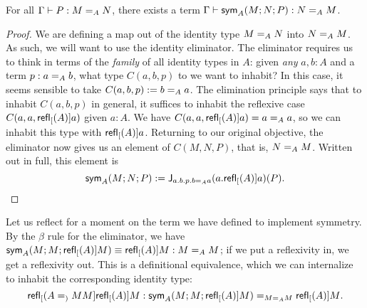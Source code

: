 \documentclass{article}
\newcommand{\Idsym}[4]{\mathsf{sym}_{#1}(#2;#3;#4)}
\begin{document}
\begin{lemma}
  For all $\hasEF{\Gamma}{P}{\Ideq{A}{M}{N}}$, there exists a term
  $\hasEF{\Gamma}{\Idsym{A}{M}{N}{P}}{\Ideq{A}{N}{M}}$.
\end{lemma}
\begin{proof}
  We are defining a map out of the identity type $\Ideq{A}{M}{N}$ into
  $\Ideq{A}{N}{M}$. As such, we will want to use the identity eliminator. The
  eliminator requires us to think in terms of the \emph{family} of all identity
  types in $A$: given \emph{any} $a,b : A$ and a term $p : \Ideq{A}{a}{b}$, what
  type $C(a,b,p)$ to we want to inhabit? In this case, it seems sensible to take
  $C(a,b,p) \eqdef \Ideq{A}{b}{a}$. The elimination principle says that to inhabit
  $C(a,b,p)$ in general, it suffices to inhabit the reflexive case
  $C(a,a,\refl[A]{a})$ given $a : A$. We have
  $C(a,a,\refl[A]{a}) = \Ideq{A}{a}{a}$, so we can inhabit this type with
  $\refl[A]{a}$. Returning to our original objective, the eliminator now gives
  us an element of $C(M,N,P)$, that is, $\Ideq{A}{N}{M}$.  Written out in full,
  this element is
  \[
    \Idsym{A}{M}{N}{P} \eqdef
    \Idelim{a.b.p.\Ideq{A}{b}{a}}{a.\refl[A]{a}}{P}. \qedhere
  \]
\end{proof}

Let us reflect for a moment on the term we have defined to implement
symmetry. By the $\beta$ rule for the eliminator, we have
$\hasEEF{\Idsym{A}{M}{M}{\refl[A]{M}}}{\refl[A]{M}}{\Ideq{A}{M}{M}}$; if we put
a reflexivity in, we get a reflexivity out. This is a definitional equivalence,
which we can internalize to inhabit the corresponding identity type:
\[
 \hasEF{\refl[\Ideq{A}{M}{M}]{\refl[A]{M}}}{\Ideq{\Ideq{A}{M}{M}}{\Idsym{A}{M}{M}{\refl[A]{M}}}{\refl[A]{M}}}.
\]
\end{document}
